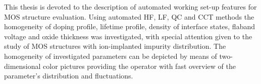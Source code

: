 This thesis is devoted to the description of automated working set-up
features for MOS structure evaluation. Using automated HF, LF, QC and
CCT methods the homogeneity of doping profile, lifetime profile,
density of interface states, flaband voltage and oxide thickness was
investigated, with special attention given to the study of MOS
structures with ion-implanted impurity distribution. The homogeneity
of investigated parameters can be depicted by means of two-dimensional
color pictures providing the operator with fast overview of the
parameter's distribution and fluctuations.
